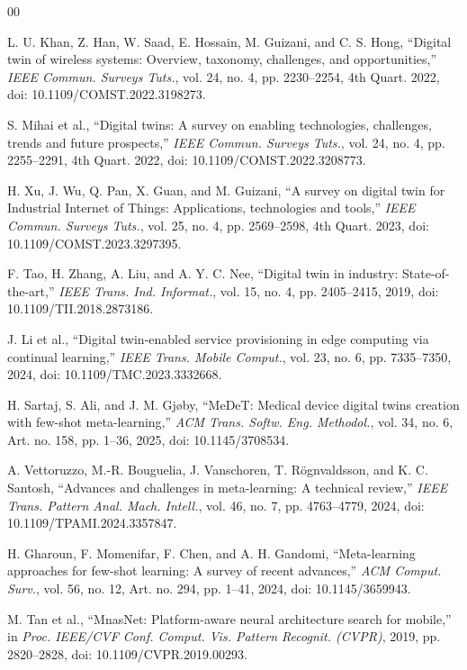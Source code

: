 \documentclass[a4paper,fleqn]{cas-sc}
\begin{document}
\begin{thebibliography}{00}

 L. U. Khan, Z. Han, W. Saad, E. Hossain, M. Guizani, and C. S. Hong, ``Digital twin of wireless systems: Overview, taxonomy, challenges, and opportunities,'' \emph{IEEE Commun. Surveys Tuts.}, vol. 24, no. 4, pp. 2230--2254, 4th Quart. 2022, doi: 10.1109/COMST.2022.3198273.

 S. Mihai et al., ``Digital twins: A survey on enabling technologies, challenges, trends and future prospects,'' \emph{IEEE Commun. Surveys Tuts.}, vol. 24, no. 4, pp. 2255--2291, 4th Quart. 2022, doi: 10.1109/COMST.2022.3208773.

 H. Xu, J. Wu, Q. Pan, X. Guan, and M. Guizani, ``A survey on digital twin for Industrial Internet of Things: Applications, technologies and tools,'' \emph{IEEE Commun. Surveys Tuts.}, vol. 25, no. 4, pp. 2569--2598, 4th Quart. 2023, doi: 10.1109/COMST.2023.3297395.

 F. Tao, H. Zhang, A. Liu, and A. Y. C. Nee, ``Digital twin in industry: State-of-the-art,'' \emph{IEEE Trans. Ind. Informat.}, vol. 15, no. 4, pp. 2405--2415, 2019, doi: 10.1109/TII.2018.2873186.

 J. Li et al., ``Digital twin-enabled service provisioning in edge computing via continual learning,'' \emph{IEEE Trans. Mobile Comput.}, vol. 23, no. 6, pp. 7335--7350, 2024, doi: 10.1109/TMC.2023.3332668.

 H. Sartaj, S. Ali, and J. M. Gj{\o}by, ``MeDeT: Medical device digital twins creation with few-shot meta-learning,'' \emph{ACM Trans. Softw. Eng. Methodol.}, vol. 34, no. 6, Art. no. 158, pp. 1--36, 2025, doi: 10.1145/3708534.

 A. Vettoruzzo, M.-R. Bouguelia, J. Vanschoren, T. R{\"o}gnvaldsson, and K. C. Santosh, ``Advances and challenges in meta-learning: A technical review,'' \emph{IEEE Trans. Pattern Anal. Mach. Intell.}, vol. 46, no. 7, pp. 4763--4779, 2024, doi: 10.1109/TPAMI.2024.3357847.

 H. Gharoun, F. Momenifar, F. Chen, and A. H. Gandomi, ``Meta-learning approaches for few-shot learning: A survey of recent advances,'' \emph{ACM Comput. Surv.}, vol. 56, no. 12, Art. no. 294, pp. 1--41, 2024, doi: 10.1145/3659943.

 M. Tan et al., ``MnasNet: Platform-aware neural architecture search for mobile,'' in \emph{Proc. IEEE/CVF Conf. Comput. Vis. Pattern Recognit. (CVPR)}, 2019, pp. 2820--2828, doi: 10.1109/CVPR.2019.00293.


\end{thebibliography}
\end{document}
